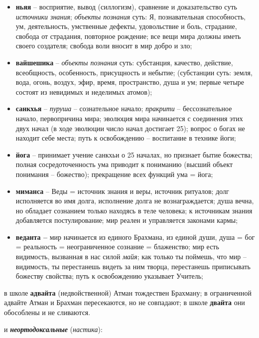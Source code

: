 \begin{itemize}
\item \textbf{ньяя} – восприятие, вывод (силлогизм), сравнение и доказательство суть \textit{источники знания};
\textit{объекты познания} суть: Я, познавательная способность, ум, деятельность, умственные дефекты, удовольствие и
боль, страдание, свобода от страдания, повторное рождение; все вещи мира должны иметь своего создателя; свобода воли
вносит в мир добро и зло;
\item \textbf{вайшешика} – \textit{объекты познания} суть: субстанция, качество, действие, всеобщность, особенность,
присущность и небытие; (субстанции суть: земля, вода, огонь, воздух, эфир, время, пространство, душа и ум; первые
четыре состоят из невидимых и неделимых атомов);
\item \textbf{санкхья} – \textit{пуруша} – сознательное начало; \textit{пракрити} – бессознательное начало, первопричина мира;
эволюция мира начинается с соединения этих двух начал (в ходе эволюции число начал достигает 25); вопрос о богах не
находит себе места; путь к освобождению – воспитание в технике йоги;
\item \textbf{йога} – принимает учение санкхьи о 25 началах, но признает бытие божества; полная сосредоточенность ума приводит
к пониманию (высший объект понимания – божество); прекращение всех функций ума = йога;
\item \textbf{миманса} – Веды = источник знания и веры, источник ритуалов; долг исполняется во имя долга, исполнение долга не
вознаграждается; душа вечна, но обладает сознанием только находясь в теле человека; к источникам знания добавляется
постулирование; мир реален и управляется законами кармы;
\item \textbf{веданта – }мир начинается из единого Брахмана, из единой души, душа = бог = реальность = неограниченное сознание
= блаженство; мир есть видимость, вызванная в нас силой \textit{майя}; как только ты поймешь, что мир – видимость, ты
перестанешь видеть за ним творца, перестанешь приписывать божеству свойства; путь к освобождению указывает Учитель;
\end{itemize}

в школе \textbf{адвайта} (недвойственной) Атман тождествен Брахману; в ограниченной адвайте Атман и Брахман
{\textquotedbl}пересекаются{\textquotedbl}, но не совпадают; в школе \textbf{двайта} они обособлены и не сливаются.

и \textbf{\textit{неортодоксальные}} (\textit{настика}):


